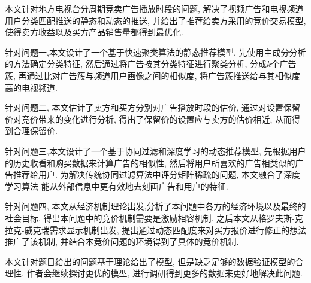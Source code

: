 本文针对地方电视台分周期竞卖广告播放时段的问题,
解决了视频广告和电视频道用户分类匹配推送的静态和动态的推送,
并给出了推荐给卖方采用的竞价交易模型,
使得卖方收益以及买方产品销售量都得到最优化.

针对问题一,本文设计了一个基于快速聚类算法的静态推荐模型, 先使用主成分分析的方法确定分类特征,
然后通过将广告按其分类特征进行聚类分析, 分成$k$个广告簇,
再通过比对广告簇与频道用户画像之间的相似度, 将广告簇推送给与其相似度高的电视频道.

针对问题二, 本文估计了卖方和买方分别对广告播放时段的估价,
通过对设置保留价对竞价带来的变化进行分析,
得出了保留价的设置应与卖方的估价相近,
从而得到合理保留价.

针对问题三,本文设计了一个基于协同过滤和深度学习的动态推荐模型, 先根据用户的历史收看和购买数据来计算广告的相似性,
然后将用户所喜欢的广告相类似的广告推荐给用户. 为解决传统协同过滤算法中评分矩阵稀疏的问题, 本文融合了深度学习算法
能从外部信息中更有效地去刻画广告和用户的特征.

针对问题四, 本文从经济机制理论出发,分析了本问题中各方的经济环境以及最终的社会目标,
得出本问题中的竞价机制需要是激励相容机制.
之后本文从格罗夫斯-克拉克-威克瑞需求显示机制出发,
提出通过动态匹配度来对买方报价进行修正的想法推广了该机制,
并结合本竞价问题的环境得到了具体的竞价机制.

本文针对题目给出的问题基于理论给出了模型, 但是缺乏足够的数据验证模型的合理性.
作者会继续探讨更优的模型, 进行调研得到更多的数据来更好地解决此问题.
